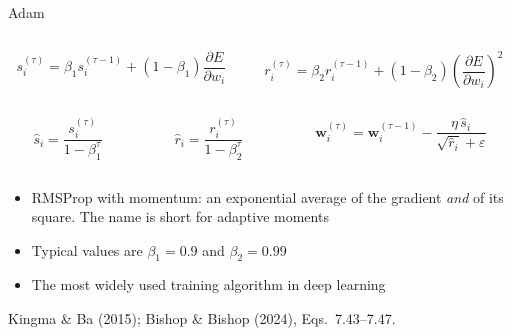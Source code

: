 \documentclass[aspectratio=169, 11pt]{beamer}
\newcommand{\srcline}[1]{%
  \par\vspace{0.25em}%
  {\scriptsize\color{mcMuted}\hfill #1\par}}
\newcommand{\src}[3]{}      %
\begin{document}
\begin{frame}{Adam}
  \src{bishop2024}{equation}{7.43-7.47}
  \src{bishop2024}{section}{7.3.3}
  \src{kingma2015}{algorithm}{1}
  \vspace{-0.55em}
  \begin{columns}[T, onlytextwidth]
    \begin{column}{0.485\textwidth}
      \[ s^{(\tau)}_i = \beta_1 s^{(\tau-1)}_i
         + (1-\beta_1)\frac{\partial E}{\partial w_i} \]
    \end{column}
    \begin{column}{0.50\textwidth}
      \[ r^{(\tau)}_i = \beta_2 r^{(\tau-1)}_i
         + (1-\beta_2)\left(\frac{\partial E}{\partial w_i}\right)^{2} \]
    \end{column}
  \end{columns}
  \vspace{-0.55em}
  \begin{columns}[T, onlytextwidth]
    \begin{column}{0.30\textwidth}
      \[ \hat s_i = \frac{s^{(\tau)}_i}{1-\beta_1^{\tau}} \]
    \end{column}
    \begin{column}{0.30\textwidth}
      \[ \hat r_i = \frac{r^{(\tau)}_i}{1-\beta_2^{\tau}} \]
    \end{column}
    \begin{column}{0.38\textwidth}
      \[ \mathbf{w}^{(\tau)}_i = \mathbf{w}^{(\tau-1)}_i
         - \frac{\eta\,\hat s_i}{\sqrt{\hat r_i} + \varepsilon} \]
    \end{column}
  \end{columns}
  \vspace{0.1em}
  \begin{itemize}\itemsep0.3em
    \item RMSProp with momentum: an exponential average of the gradient
          \emph{and} of its square. The name is short for
          \alert{adaptive moments}
    \item Typical values are $\beta_1 = 0.9$ and $\beta_2 = 0.99$
    \item The most widely used training algorithm in deep learning
  \end{itemize}
  \srcline{Kingma \& Ba (2015); Bishop \& Bishop (2024),
  Eqs.~7.43--7.47.}
\end{frame}
\end{document}
